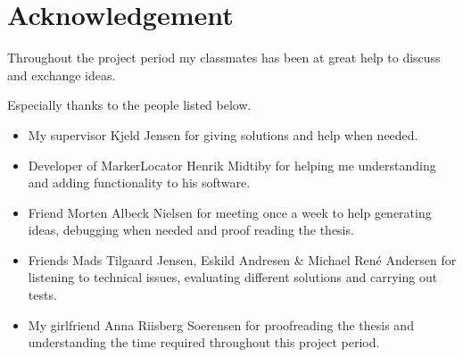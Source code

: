 \section*{Acknowledgement}
Throughout the project period my classmates has been at great help to discuss and exchange ideas.

Especially thanks to the people listed below.
\begin{itemize}
	\item My supervisor Kjeld Jensen for giving solutions and help when needed.
	\item Developer of MarkerLocator Henrik Midtiby for helping me understanding and adding functionality to his software.
	\item Friend Morten Albeck Nielsen for meeting once a week to help generating ideas, debugging when needed and proof reading the thesis.
	\item Friends Mads Tilgaard Jensen, Eskild Andresen \& Michael René Andersen for listening to technical issues, evaluating different solutions and carrying out tests.
	\item My girlfriend Anna Riisberg Soerensen for proofreading the thesis and understanding the time required throughout this project period.
\end{itemize}